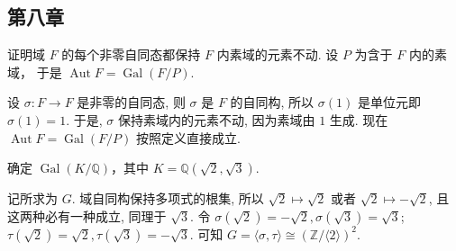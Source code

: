 \subsection{第八章}
\setcounter{pb}{2}
\begin{problem}
    证明域 $ F $ 的每个非零自同态都保持 $ F $ 内素域的元素不动. 设 $ P $ 为含于 $ F $ 内的素域， 于是 $ \operatorname{Aut} F = \operatorname{Gal}(F/P) $.
\end{problem}

\begin{solution}
    设 $\sigma\colon F\to F$ 是非零的自同态, 则 $\sigma$ 是 $F$ 的自同构, 
    所以 $\sigma(1)$ 是单位元即 $\sigma(1)=1$. 于是, $\sigma$ 保持素域内的元素不动, 因为素域由 $1$ 生成. 
    现在 $\operatorname{Aut}F=\operatorname{Gal}(F/P)$ 按照定义直接成立. 
\end{solution}

\setcounter{pb}{4}
\begin{problem}
    确定 $ \operatorname{Gal}(K/\mathbb{Q}) $，其中 $ K = \mathbb{Q}(\sqrt{2}, \sqrt{3}) $.
\end{problem}

\begin{solution}
    记所求为 $G$. 域自同构保持多项式的根集, 所以 $\sqrt{2}\mapsto\sqrt{2}$ 或者 $\sqrt{2}\mapsto-\sqrt{2}$, 且这两种必有一种成立, 同理于 $\sqrt{3}$. 
    令 $\sigma(\sqrt{2})=-\sqrt{2},\sigma(\sqrt{3})=\sqrt{3}$; $\tau(\sqrt{2})=\sqrt{2},\tau(\sqrt{3})=-\sqrt{3}$.
    可知 $G=\langle \sigma,\tau \rangle \cong (\mathbb{Z}/\langle 2 \rangle)^{2}$.
\end{solution}




